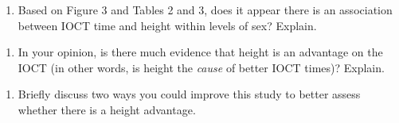 \documentclass[]{book}
\providecommand{\tightlist}{%
  \setlength{\itemsep}{0pt}\setlength{\parskip}{0pt}}
\begin{document}
\begin{enumerate}
\def\labelenumi{\arabic{enumi}.}
\setcounter{enumi}{13}
\tightlist
\item
  Based on Figure 3 and Tables 2 and 3, does it appear there is an association between IOCT time and height within levels of sex? Explain.
\end{enumerate}

\vspace{1in}

\newpage

\begin{enumerate}
\def\labelenumi{\arabic{enumi}.}
\setcounter{enumi}{14}
\tightlist
\item
  In your opinion, is there much evidence that height is an advantage on the IOCT (in other words, is height the \emph{cause} of better IOCT times)? Explain.
\end{enumerate}

\vspace{2in}

\begin{enumerate}
\def\labelenumi{\arabic{enumi}.}
\setcounter{enumi}{15}
\tightlist
\item
  Briefly discuss two ways you could improve this study to better assess whether there is a height advantage.
\end{enumerate}

\vspace{1in}


\end{document}
